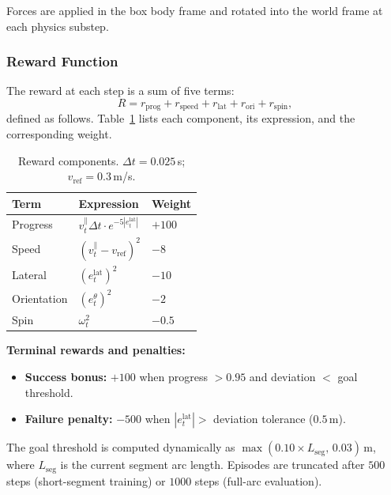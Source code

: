 Forces are applied in the box body frame and rotated into the world frame at each physics substep.

\subsubsection{Reward Function}

The reward at each step is a sum of five terms:
%
\begin{equation}
    R = r_{\text{prog}} + r_{\text{speed}} + r_{\text{lat}} + r_{\text{ori}} + r_{\text{spin}},
\end{equation}
%
defined as follows.
Table~\ref{tab:reward} lists each component, its expression, and the corresponding weight.

\begin{table}[h]
\centering
\caption{Reward components. $\Delta t = 0.025$\,s; $v_{\mathrm{ref}} = 0.3$\,m/s.}
\label{tab:reward}
\small
\begin{tabular}{lll}
\toprule
\textbf{Term} & \textbf{Expression} & \textbf{Weight} \\
\midrule
Progress  & $v^{\parallel}_t \Delta t \cdot e^{-5|e^{\mathrm{lat}}_t|}$ & $+100$ \\
Speed     & $(v^{\parallel}_t - v_{\mathrm{ref}})^2$       & $-8$   \\
Lateral   & $(e^{\mathrm{lat}}_t)^2$                        & $-10$  \\
Orientation & $(e^{\theta}_t)^2$                             & $-2$   \\
Spin      & $\omega_t^2$                                    & $-0.5$ \\
\bottomrule
\end{tabular}
\end{table}

\noindent\textbf{Terminal rewards and penalties:}
\begin{itemize}
    \item \textbf{Success bonus:} $+100$ when progress $> 0.95$ and deviation $<$ goal threshold.
    \item \textbf{Failure penalty:} $-500$ when $|e^{\mathrm{lat}}_t| >$ deviation tolerance ($0.5$\,m).
\end{itemize}

The goal threshold is computed dynamically as $\max(0.10 \times L_{\mathrm{seg}},\, 0.03)$\,m, where $L_{\mathrm{seg}}$ is the current segment arc length.
Episodes are truncated after $500$ steps (short-segment training) or $1000$ steps (full-arc evaluation).

